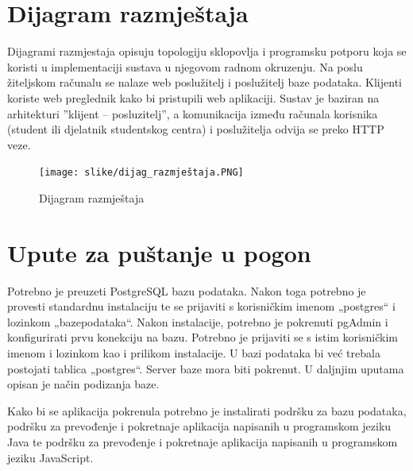 			\eject 
		
		
		\section{Dijagram razmještaja}
			
			Dijagrami razmjestaja opisuju topologiju sklopovlja i programsku potporu koja se koristi u implementaciji sustava u njegovom radnom okruzenju. Na poslu žiteljskom
računalu se nalaze web poslužitelj i poslužitelj baze podataka. Klijenti koriste web preglednik kako bi pristupili web aplikaciji. Sustav je baziran na arhitekturi ”klijent – posluzitelj”, a komunikacija između računala korisnika (student ili djelatnik studentskog centra) i poslužitelja odvija se preko HTTP veze.
		
		\begin{figure}[H]
				\texttt{[image: slike/dijag\_razmještaja.PNG]} %
				\centering
				\caption{Dijagram razmještaja}
				\label{fig:java}
			\end{figure}
			
			\eject
		
		\section{Upute za puštanje u pogon}

Potrebno je preuzeti PostgreSQL bazu podataka. Nakon toga potrebno je provesti standardnu instalaciju 
te se prijaviti s korisničkim imenom „postgres“ i lozinkom „bazepodataka“. 
Nakon instalacije, potrebno je pokrenuti pgAdmin i konfigurirati prvu konekciju na bazu. Potrebno je 
prijaviti se s istim korisničkim imenom i lozinkom kao i prilikom instalacije. U bazi podataka bi već 
trebala postojati tablica „postgres“. 
Server baze mora biti pokrenut. U daljnjim uputama opisan je način podizanja baze.
\vspace{3mm}

Kako bi se aplikacija pokrenula potrebno je instalirati podršku za bazu podataka, podršku za 
prevođenje i pokretnaje aplikacija napisanih u programskom jeziku Java te podršku za 
prevođenje i pokretnaje aplikacija napisanih u programskom jeziku JavaScript.
\vspace{3mm}


